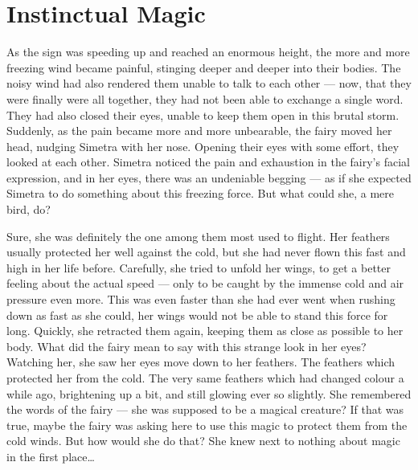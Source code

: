 \chapter{Instinctual Magic}
\label{cha:instinctual-magic}
As the sign was speeding up and reached an enormous height, the more and more freezing wind became painful, stinging deeper and deeper into their bodies. The noisy wind had also rendered them unable to talk to each other --- now, that they were finally were all together, they had not been able to exchange a single word. They had also closed their eyes, unable to keep them open in this brutal storm.
Suddenly, as the pain became more and more unbearable, the fairy moved her head, nudging Simetra with her nose. Opening their eyes with some effort, they looked at each other. Simetra noticed the pain and exhaustion in the fairy's facial expression, and in her eyes, there was an undeniable begging --- as if she expected Simetra to do something about this freezing force. But what could she, a mere bird, do?

Sure, she was definitely the one among them most used to flight. Her feathers usually protected her well against the cold, but she had never flown this fast and high in her life before. Carefully, she tried to unfold her wings, to get a better feeling about the actual speed --- only to be caught by the immense cold and air pressure even more. This was even faster than she had ever went when rushing down as fast as she could, her wings would not be able to stand this force for long. Quickly, she retracted them again, keeping them as close as possible to her body. What did the fairy mean to say with this strange look in her eyes? Watching her, she saw her eyes move down to her feathers. The feathers which protected her from the cold. The very same feathers which had changed colour a while ago, brightening up a bit, and still glowing ever so slightly. She remembered the words of the fairy --- she was supposed to be a magical creature? If that was true, maybe the fairy was asking here to use this magic to protect them from the cold winds. But how would she do that? She knew next to nothing about magic in the first place\dots{}

